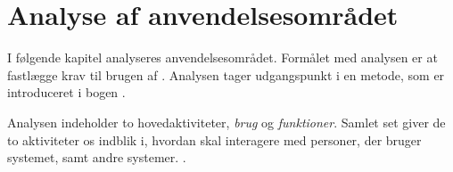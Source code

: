 \chapter{Analyse af anvendelsesområdet}
\label{chap:analyseafao}

I følgende kapitel analyseres anvendelsesområdet. Formålet med analysen er at fastlægge krav til brugen af \Foodl{}. Analysen tager udgangspunkt i en metode, som er introduceret i bogen \ooadbog{}\cite[s. ~113]{ooad}. 

Analysen indeholder to hovedaktiviteter, \textit{brug} og \textit{funktioner}. Samlet set giver de to aktiviteter os indblik i, hvordan \foodl skal interagere med personer, der bruger systemet, samt andre systemer.
\cite[s. ~115]{ooad}.




